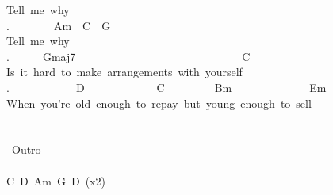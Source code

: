 {Tell\ me\ why\ \ \\
.\ \ \ \ \ \ \ \ Am\ \ C\ \ G\\
Tell\ me\ why\ \ \\
.\ \ \ \ \ \ Gmaj7\ \ \ \ \ \ \ \ \ \ \ \ \ \ \ \ \ \ \ \ \ \ \ \ \ \ \ \ \ \ C\\
Is\ it\ hard\ to\ make\ arrangements\ with\ yourself\\
.\ \ \ \ \ \ \ \ \ \ \ \ D\ \ \ \ \ \ \ \ \ \ \ \ \ C\ \ \ \ \ \ \ \ \ Bm\ \ \ \ \ \ \ \ \ \ \ \ \ \ Em\ \ \\
When\ you're\ old\ enough\ to\ repay\ but\ young\ enough\ to\ sell\\
\\
\\
\lbrack\ Outro\rbrack\\
\\
C\ D\ Am\ G\ D\ (x2)}
